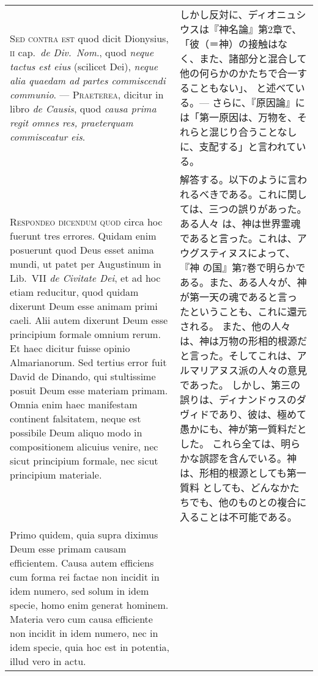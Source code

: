 \documentclass[10pt]{jsarticle} %
\begin{document}
\begin{longtable}{p{21em}p{21em}}
\\

{\scshape Sed contra est} quod dicit Dionysius, {\scshape ii} cap.~{\itshape de
 Div.~Nom}., quod {\itshape neque tactus est eius} (scilicet Dei), {\itshape neque alia
 quaedam ad partes commiscendi communio}. ---
{\scshape Praeterea}, dicitur in libro {\itshape de Causis}, quod {\itshape causa prima regit
 omnes res, praeterquam commisceatur eis}.

&

しかし反対に、ディオニュシウスは『神名論』第2章で、「彼（＝神）の接触はな
 く、また、諸部分と混合して他の何らかのかたちで合一することもない」、
 と述べている。---
さらに、『原因論』には「第一原因は、万物を、それらと混じり合うことなしに、支配する」と言われている。


\\




{\scshape Respondeo dicendum quod} circa hoc fuerunt tres
 errores. Quidam enim posuerunt quod Deus esset anima mundi, ut patet
 per Augustinum in Lib.~VII {\itshape de Civitate Dei}, et ad hoc etiam
 reducitur, quod quidam dixerunt Deum esse animam primi caeli.  Alii
 autem dixerunt Deum esse principium formale omnium rerum. Et haec
 dicitur fuisse opinio Almarianorum.  Sed tertius error fuit David de
 Dinando, qui stultissime posuit Deum esse materiam primam.  Omnia enim
 haec manifestam continent falsitatem, neque est possibile Deum aliquo
 modo in compositionem alicuius venire, nec sicut principium formale,
 nec sicut principium materiale.

&

解答する。以下のように言われるべきである。これに関しては、三つの誤りがあった。ある人々
 は、神は世界霊魂であると言った。これは、アウグスティヌスによって、『神
 の国』第7巻で明らかである。また、ある人々が、神が第一天の魂であると言っ
 たということも、これに還元される。
また、他の人々は、神は万物の形相的根源だと言った。そしてこれは、アルマリアヌス派の人々の意見であった。
しかし、第三の誤りは、ディナンドゥスのダヴィドであり、彼は、極めて愚かにも、神が第一質料だとした。
これら全ては、明らかな誤謬を含んでいる。神は、形相的根源としても第一質料
 としても、どんなかたちでも、他のものとの複合に入ることは不可能である。

\\

Primo quidem, quia supra diximus Deum esse primam causam
 efficientem. Causa autem efficiens cum forma rei factae non incidit in
 idem numero, sed solum in idem specie, homo enim generat
 hominem. Materia vero cum causa efficiente non incidit in idem numero,
 nec in idem specie, quia hoc est in potentia, illud vero in actu. 


\end{longtable}
\end{document}
